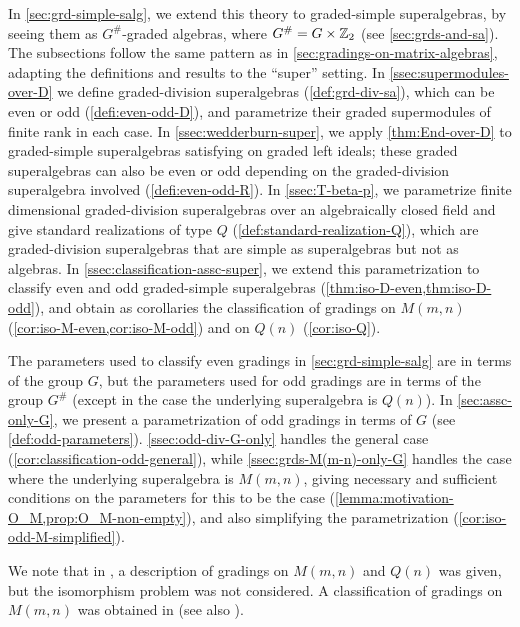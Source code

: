 In \cref{sec:grd-simple-salg}, we extend this theory to graded-simple superalgebras, by seeing them as $G^\#$-graded algebras, where $G^\# = G \times \mathbb{Z}_2$ (see \cref{sec:grds-and-sa}). 
The subsections follow the same pattern as in \cref{sec:gradings-on-matrix-algebras}, adapting the definitions and results to the ``super'' setting. 
In \cref{ssec:supermodules-over-D} we define graded-division superalgebras (\cref{def:grd-div-sa}), which can be even or odd (\cref{defi:even-odd-D}), and parametrize their graded supermodules of finite rank in each case. 
In \cref{ssec:wedderburn-super}, we apply \cref{thm:End-over-D} to graded-simple superalgebras satisfying \dcc on graded left ideals; these graded superalgebras can also be even or odd depending on the graded-division superalgebra involved (\cref{defi:even-odd-R}). 
In \cref{ssec:T-beta-p}, we parametrize finite dimensional graded-division superalgebras over an algebraically closed field and give standard realizations of type $Q$ (\cref{def:standard-realization-Q}), which are graded-division superalgebras that are simple as superalgebras but not as algebras. 
In \cref{ssec:classification-assc-super}, we extend this parametrization to classify even and odd graded-simple superalgebras (\cref{thm:iso-D-even,thm:iso-D-odd}), and obtain as corollaries the classification of gradings on $M(m,n)$ (\cref{cor:iso-M-even,cor:iso-M-odd}) and on $Q(n)$ (\cref{cor:iso-Q}).

The parameters used to classify even gradings in \cref{sec:grd-simple-salg} are in terms of the group $G$, but the parameters used for odd gradings are in terms of the group $G^\#$ (except in the case the underlying superalgebra is $Q(n)$). 
In \cref{sec:assc-only-G}, we present a parametrization of odd gradings in terms of $G$ (see \cref{def:odd-parameters}). 
\cref{ssec:odd-div-G-only} handles the general case (\cref{cor:classification-odd-general}), while \cref{ssec:grds-M(m-n)-only-G} handles the case where the underlying superalgebra is $M(m,n)$, giving necessary and sufficient conditions on the parameters for this to be the case (\cref{lemma:motivation-O_M,prop:O_M-non-empty}), and also simplifying the parametrization (\cref{cor:iso-odd-M-simplified}). 

We note that in \cite{BS}, a description of gradings on $M(m,n)$ and $Q(n)$ was given, but the isomorphism problem was not considered. 
A classification of gradings on $M(m,n)$ was obtained in \cite{paper-MAP} (see also \cite{Helens_thesis}). 


